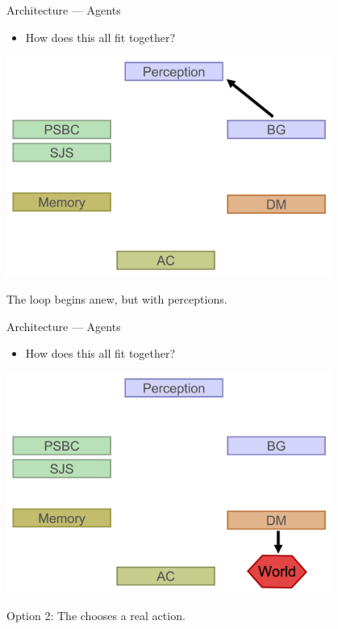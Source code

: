    \begin{frame}{Architecture --- Agents}
      \begin{itemize}
         \item {How does this all fit together?}
      \end{itemize}
      
      \begin{center}
         \includegraphics[width=0.8\textwidth]{plan_4.png}
      \end{center}
      
      The loop begins anew, but with  perceptions.
   \end{frame}
   
   \begin{frame}{Architecture --- Agents}
      \begin{itemize}
         \item {How does this all fit together?}
      \end{itemize}
      
      \begin{center}
         \includegraphics[width=0.8\textwidth]{plan_5.png}
      \end{center}
      
      Option 2: The  chooses a real action.
   \end{frame}
   
